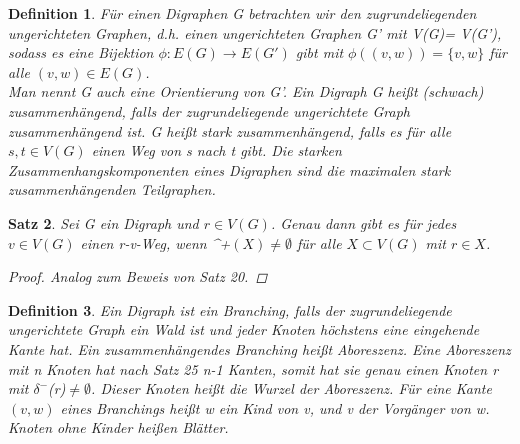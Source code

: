 \documentclass{beamer}
\newtheorem{satz}{Satz}
\newtheorem{defi}[satz]{Definition}
\begin{document}
  \begin{frame}
  \vfill
    \begin{center}
      \begin{defi} 
      Für einen Digraphen G betrachten wir den zugrundeliegenden ungerichteten Graphen, d.h. einen ungerichteten Graphen G' mit V(G)= V(G'), sodass es eine Bijektion $\phi : E(G)\rightarrow E(G')$ gibt mit $\phi((v,w))= \{v,w\}$ für alle $(v,w)\in E(G)$.\\
       Man nennt G auch eine Orientierung von G'.
        Ein Digraph G heißt (schwach) zusammenhängend, falls der zugrundeliegende ungerichtete Graph zusammenhängend ist.
        G heißt stark zusammenhängend, falls es für alle $s,t \in V(G)$ einen Weg von s nach t gibt.
        Die starken Zusammenhangskomponenten eines Digraphen sind die maximalen stark zusammenhängenden Teilgraphen.
      \end{defi}
    \end{center}
  \vfill
  \end{frame}

  \begin{frame}
  \vfill
    \begin{center}
     \begin{satz} 
        Sei G ein Digraph und $r \in V(G)$.
        Genau dann gibt es für jedes $v\in V(G)$ einen r-v-Weg, wenn $ $\delta^+$(X) \neq \emptyset$ für alle $X\subset V(G)$ mit $r \in X$.
        \begin{proof}
         Analog zum Beweis von Satz 20.
        \end{proof} 
      \end{satz} 
    \end{center}
  \vfill
\end{frame}

 \begin{frame}
  \vfill
    \begin{center}
     \begin{defi} 
       Ein Digraph ist ein Branching, falls der zugrundeliegende ungerichtete Graph ein Wald ist und jeder Knoten höchstens eine eingehende Kante hat.
        Ein zusammenhängendes Branching heißt Aboreszenz.
        Eine Aboreszenz mit n Knoten hat nach Satz 25 n-1 Kanten, somit hat sie genau einen Knoten r mit $\delta^-$(r)$\neq \emptyset$.
        Dieser Knoten heißt die Wurzel der Aboreszenz. 
        Für eine Kante $(v,w)$ eines Branchings heißt w ein Kind von v, und v der Vorgänger von w.
      Knoten ohne Kinder heißen Blätter.
     \end{defi} 
    \end{center}
  \vfill
  \end{frame}
\end{document}
